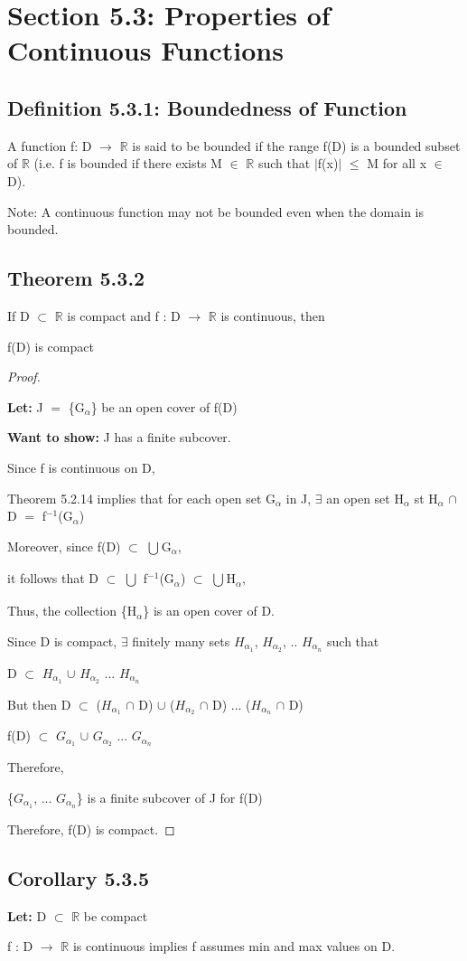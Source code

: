 \documentclass{article}
\newcommand{\mt}[1]{\ensuremath{#1}}
\newcommand\bsc[2][\DefaultOpt]{%
  \def\DefaultOpt{#2}%
  \section[#1]{#2}%
}
\newcommand\ssc[2][\DefaultOpt]{%
  \def\DefaultOpt{#2}%
  \subsection[#1]{#2}%
}
\newcommand{\bgpf}{\begin{proof} $ $\newline}
\newcommand{\lt}[1]{\textbf{Let: } #1}
\newcommand{\wts}[1]{\textbf{Want to show: } #1}
\newcommand{\epf}{\end{proof}}
\newcommand{\dbs}[3]{\mt{#1_{#2_#3}}}
\newcommand{\br}{\mt{\mathbb{R}} }       %
\newcommand{\afa}{\mt{\alpha} }
\newcommand{\mem}{\mt{\in} }
\newcommand{\exs}{\mt{\exists} }
\newcommand{\sbs}{\mt{\subset} }         %
\newcommand{\lra}{ \mt{\longrightarrow} } %
\newcommand{\av}[1]{\mt{|}#1\mt{|}}  %
\newcommand{\bk}[1]{\{#1\}}
\newcommand{\lse}{\mt{\leq} }
\newcommand{\eql}{\mt{=} }
\newcommand{\uw}[2]{#1\mt{_{#2}}}
\newcommand{\uf}[2]{#1\mt{^{#2}}}
\newcommand{\urng}[2]{\mt{\bigcup_{#1}^{#2}}}
\newcommand{\unn}{\mt{\cup} }
\newcommand{\inn}{\mt{\cap} }
\begin{document}
\bsc{Section 5.3: Properties of Continuous Functions}{

\ssc{Definition 5.3.1: Boundedness of Function}{

A function f: D \lra \br is said to be bounded if the range f(D) is a bounded subset of \br (i.e. f is bounded if there exists M \mem \br such that \av{f(x)} \lse M for all x \mem D).

Note: A continuous function may not be bounded even when the domain is bounded.
}

\ssc{Theorem 5.3.2}{

If D \sbs \br is compact and f : D \lra \br is continuous, then

f(D) is compact

\bgpf

\lt{J \eql \bk{\uw{G}{\afa}} be an open cover of f(D)}

\wts{J has a finite subcover.}

Since f is continuous on D, 

Theorem 5.2.14 implies that for each open set \uw{G}{\afa} in J, \exs an open set \uw{H}{\afa} st \uw{H}{\afa} \inn D \eql \uf{f}{-1}(\uw{G}{\afa})

Moreover, since f(D) \sbs \urng{}{}\uw{G}{\afa},

it follows that D \sbs \urng{}{} \uf{f}{-1}(\uw{G}{\afa}) \sbs \urng{}{}\uw{H}{\afa},

Thus, the collection \bk{\uw{H}{\afa}} is an open cover of D.

Since D is compact, \exs finitely many sets \dbs{H}{\afa}{1}, \dbs{H}{\afa}{2}, .. \dbs{H}{\afa}{n} such that

D \sbs \dbs{H}{\afa}{1} \unn \dbs{H}{\afa}{2} ... \dbs{H}{\afa}{n}

But then D \sbs (\dbs{H}{\afa}{1} \inn D) \unn (\dbs{H}{\afa}{2} \inn D) ... (\dbs{H}{\afa}{n} \inn D)

f(D) \sbs \dbs{G}{\afa}{1} \unn \dbs{G}{\afa}{2} ... \dbs{G}{\afa}{n}

Therefore,

\bk{\dbs{G}{\afa}{1}, ... \dbs{G}{\afa}{n}} is a finite subcover of J for f(D)

Therefore, f(D) is compact.

\epf

}

\ssc{Corollary 5.3.5}{

\lt{D \sbs \br be compact}

f : D \lra \br is continuous implies f assumes min and max values on D.

}}
\end{document}

